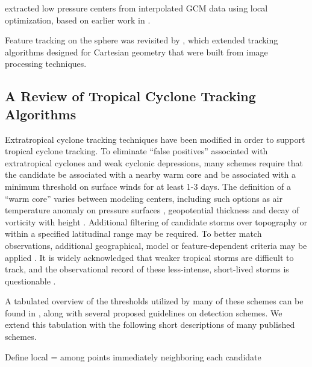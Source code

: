 \documentclass[gmdd, hvmath, online]{copernicus_discussions}
\begin{document}
\cite{murray1991numerical} extracted low pressure centers from interpolated GCM data using local optimization, based on earlier work in \cite{rice1982durivation}.

Feature tracking on the sphere was revisited by \cite{hodges1995feature}, which extended tracking algorithms designed for Cartesian geometry \cite{hodges1994general} that were built from image processing techniques.

\subsection{A Review of Tropical Cyclone Tracking Algorithms} \label{sec:TropicalCycloneAlgorithms}

Extratropical cyclone tracking techniques have been modified in order to support tropical cyclone tracking.  To eliminate ``false positives'' associated with extratropical cyclones and weak cyclonic depressions, many schemes require that the candidate be associated with a nearby warm core and be associated with a minimum threshold on surface winds for at least 1-3 days.  The definition of a ``warm core'' varies between modeling centers, including such options as air temperature anomaly on pressure surfaces \citep{Vitart1997,Zhao2009,Murakami2012}, geopotential thickness \citep{tsutsui1996simulated} and decay of vorticity with height \citep{Bengtsson2007,Strachan2013}.  Additional filtering of candidate storms over topography or within a specified latitudinal range may be required.  To better match observations, additional geographical, model or feature-dependent criteria may be applied \citep{camargo2002improving,Walsh2007,Murakami2010,Murakami2012}. It is widely acknowledged that weaker tropical storms are difficult to track, and the observational record of these less-intense, short-lived storms is questionable \citep{Landsea2010}.

A tabulated overview of the thresholds utilized by many of these schemes can be found in \cite{walsh2007objectively}, along with several proposed guidelines on detection schemes.  We extend this tabulation with the following short descriptions of many published schemes.

{\color{red}Define local = among points immediately neighboring each candidate}
\end{document}
